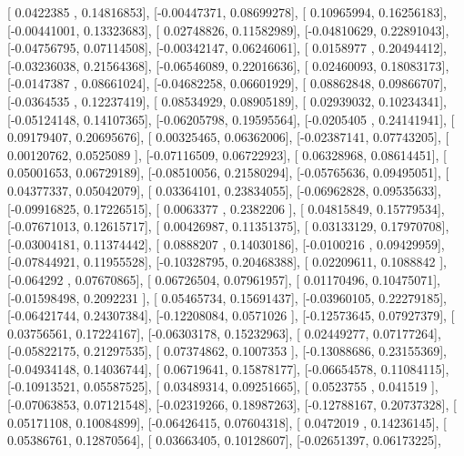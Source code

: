 \documentclass{article}
\begin{document}
       [ 0.0422385 ,  0.14816853],
       [-0.00447371,  0.08699278],
       [ 0.10965994,  0.16256183],
       [-0.00441001,  0.13323683],
       [ 0.02748826,  0.11582989],
       [-0.04810629,  0.22891043],
       [-0.04756795,  0.07114508],
       [-0.00342147,  0.06246061],
       [ 0.0158977 ,  0.20494412],
       [-0.03236038,  0.21564368],
       [-0.06546089,  0.22016636],
       [ 0.02460093,  0.18083173],
       [-0.0147387 ,  0.08661024],
       [-0.04682258,  0.06601929],
       [ 0.08862848,  0.09866707],
       [-0.0364535 ,  0.12237419],
       [ 0.08534929,  0.08905189],
       [ 0.02939032,  0.10234341],
       [-0.05124148,  0.14107365],
       [-0.06205798,  0.19595564],
       [-0.0205405 ,  0.24141941],
       [ 0.09179407,  0.20695676],
       [ 0.00325465,  0.06362006],
       [-0.02387141,  0.07743205],
       [ 0.00120762,  0.0525089 ],
       [-0.07116509,  0.06722923],
       [ 0.06328968,  0.08614451],
       [ 0.05001653,  0.06729189],
       [-0.08510056,  0.21580294],
       [-0.05765636,  0.09495051],
       [ 0.04377337,  0.05042079],
       [ 0.03364101,  0.23834055],
       [-0.06962828,  0.09535633],
       [-0.09916825,  0.17226515],
       [ 0.0063377 ,  0.2382206 ],
       [ 0.04815849,  0.15779534],
       [-0.07671013,  0.12615717],
       [ 0.00426987,  0.11351375],
       [ 0.03133129,  0.17970708],
       [-0.03004181,  0.11374442],
       [ 0.0888207 ,  0.14030186],
       [-0.0100216 ,  0.09429959],
       [-0.07844921,  0.11955528],
       [-0.10328795,  0.20468388],
       [ 0.02209611,  0.1088842 ],
       [-0.064292  ,  0.07670865],
       [ 0.06726504,  0.07961957],
       [ 0.01170496,  0.10475071],
       [-0.01598498,  0.2092231 ],
       [ 0.05465734,  0.15691437],
       [-0.03960105,  0.22279185],
       [-0.06421744,  0.24307384],
       [-0.12208084,  0.0571026 ],
       [-0.12573645,  0.07927379],
       [ 0.03756561,  0.17224167],
       [-0.06303178,  0.15232963],
       [ 0.02449277,  0.07177264],
       [-0.05822175,  0.21297535],
       [ 0.07374862,  0.1007353 ],
       [-0.13088686,  0.23155369],
       [-0.04934148,  0.14036744],
       [ 0.06719641,  0.15878177],
       [-0.06654578,  0.11084115],
       [-0.10913521,  0.05587525],
       [ 0.03489314,  0.09251665],
       [ 0.0523755 ,  0.041519  ],
       [-0.07063853,  0.07121548],
       [-0.02319266,  0.18987263],
       [-0.12788167,  0.20737328],
       [ 0.05171108,  0.10084899],
       [-0.06426415,  0.07604318],
       [ 0.0472019 ,  0.14236145],
       [ 0.05386761,  0.12870564],
       [ 0.03663405,  0.10128607],
       [-0.02651397,  0.06173225],
\end{document}
